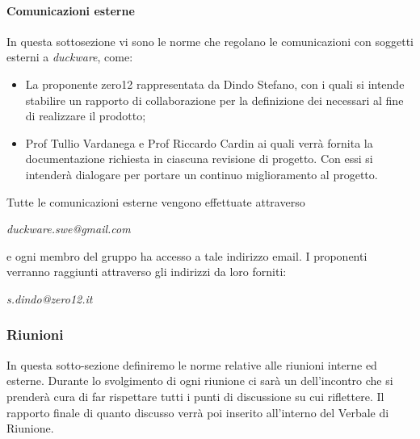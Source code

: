 \paragraph{Comunicazioni esterne}
In questa sottosezione vi sono le norme che regolano le comunicazioni con soggetti esterni a \emph{duckware}, come:
\begin{itemize}    
    \item La proponente zero12 rappresentata da Dindo Stefano, con i quali si intende stabilire un rapporto di collaborazione per la definizione dei  necessari al fine di realizzare il prodotto;
    \item Prof Tullio Vardanega e Prof Riccardo Cardin ai quali verrà fornita la documentazione richiesta in ciascuna revisione di progetto. Con essi si intenderà dialogare per portare un continuo miglioramento al progetto.
\end{itemize}
Tutte le comunicazioni esterne vengono effettuate attraverso
\begin{center}
\emph{duckware.swe@gmail.com}
\end{center}
e ogni membro del gruppo ha accesso a tale indirizzo email. I proponenti verranno raggiunti attraverso gli indirizzi da loro forniti:
\begin{center}
\emph{s.dindo@zero12.it}
\end{center}


\subsubsection{Riunioni}
In questa sotto-sezione definiremo le norme relative alle riunioni interne ed esterne. Durante lo svolgimento di ogni riunione ci sarà un  dell’incontro che si prenderà cura di far rispettare tutti i punti di discussione su cui riflettere. Il rapporto finale di quanto discusso verrà poi inserito all’interno del Verbale di Riunione. 

